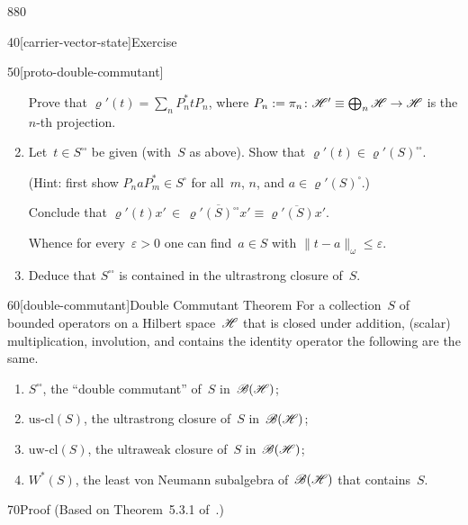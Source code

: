 \begin{parsec}{880}
\begin{point}{40}[carrier-vector-state]{Exercise}
\begin{point}{50}[proto-double-commutant]
\begin{enumerate}
Prove that $\varrho'(t)=\sum_n P_n^* t P_n$,
where $P_n:=\pi_n\colon \mathscr{H}'\equiv \bigoplus_n\mathscr{H}\to\mathscr{H}$
is the $n$-th projection.
\item

Let~$t\in S^{\square\square}$ be given
(with~$S$ as above).
Show that $\varrho'(t)\in \varrho'(S)^{\square\square}$.

(Hint: first show 
	$P_n aP_m^*\in S^\square$ for all~$m$, $n$, and
		$a\in \varrho'(S)^\square$.)

Conclude that  $\varrho'(t)x'\,\in\,\overline{\varrho'(S)^{\square\square}x'}
\equiv \overline{\varrho'(S)x'}$.

Whence for every~$\varepsilon>0$
one can find~$a\in S$ with $\|t-a\|_\omega \leq \varepsilon$.

\item
Deduce that $S^{\square\square}$
is contained in the ultrastrong closure of~$S$.
\end{enumerate}
\spacingfix
\end{point}%
\end{point}%
\begin{point}{60}[double-commutant]{Double Commutant Theorem}%
%
For a collection~$S$ of bounded operators
on a Hilbert space~$\mathscr{H}$
that is closed under addition, (scalar) multiplication,
involution, and contains the identity operator
the following are the same.
\begin{enumerate}
\item
$S^{\square\square}$, the ``double commutant'' of~$S$
in~$\mathscr{B}(\mathscr{H})$;
\item
$\mathrm{us}\text{-}\mathrm{cl}(S)$,
the ultrastrong closure of~$S$ in~$\mathscr{B}(\mathscr{H})$;
\item
$\mathrm{uw}\text{-}\mathrm{cl}(S)$,
the ultraweak closure of~$S$ in~$\mathscr{B}(\mathscr{H})$;
\item
$W^*(S)$,
the least von Neumann subalgebra of~$\mathscr{B}(\mathscr{H})$
that contains~$S$.
\end{enumerate}
\begin{point}{70}{Proof}%
(Based on Theorem~5.3.1 of~\cite{kr}.) 


\end{point}
\end{point}
\end{parsec}
